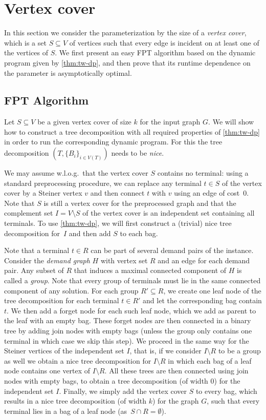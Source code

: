 \section{Vertex cover}
\label{sec:vc}

In this section we consider the parameterization by the size of a \emph{vertex cover}, which is a set $S\subseteq V$ of vertices such that every edge is incident on at least one of the vertices of $S$. 
We first present an easy FPT algorithm based on the dynamic program given by 
\cref{thm:tw-dp}, and then prove that its runtime dependence on the parameter is 
asymptotically optimal.
%

%
\subsection{FPT Algorithm}

Let $S\subseteq V$ be a given vertex cover of size $k$ for the input graph $G$. We will show how to construct a tree decomposition with all required properties of \cref{thm:tw-dp} in order to run the corresponding dynamic program. For this the tree decomposition $(T,\{B_i\}_{i\in V(T)})$ needs to be \emph{nice}.

We may assume w.l.o.g.\ that the vertex cover $S$ contains no terminal: using a standard preprocessing procedure, we can replace any terminal $t\in S$ of the vertex cover by a Steiner vertex $v$ and then connect $t$ with $v$ using an edge of cost~$0$. 
Note that $S$ is still a vertex cover for the preprocessed graph and that the complement set $I=V\setminus S$
of the vertex cover is an independent set containing all terminals. To use \cref{thm:tw-dp},
we will first construct a (trivial) nice tree decomposition for~$I$ and then add $S$ to each bag.

Note that a terminal $t\in R$ can be part of several demand pairs of the \SF instance. 
Consider the \emph{demand graph} $H$ with vertex set $R$ and an edge for each demand pair.
Any subset of $R$ that induces a maximal connected component of $H$ is called a \emph{group}.
Note that every group of terminals must lie in the same connected component of any \SF solution.
For each group $R'\subseteq R$, we create one leaf node of the tree decomposition for each terminal $t\in R'$
and let the corresponding bag contain $t$. We then add a forget node for each such leaf node, which we add
as parent to the leaf with an empty bag. These forget nodes are then connected in a binary tree by adding
join nodes with empty bags (unless the group only contains one terminal in which case we skip this step). 
We proceed in the same way for the Steiner vertices of the independent set $I$,
that is, if we consider $I\setminus R$ to be a group as well we obtain a nice tree decomposition for $I\setminus R$
in which each bag of a leaf node contains one vertex of $I\setminus R$. 
All these trees are then connected using join nodes with empty bags, to obtain a tree decomposition
(of width $0$) for the independent set $I$. Finally, we simply add the vertex cover $S$ to every bag,
which results in a nice tree decomposition (of width $k$) for the graph $G$, such that
every terminal lies in a bag of a leaf node (as~$S\cap R=\emptyset$).

